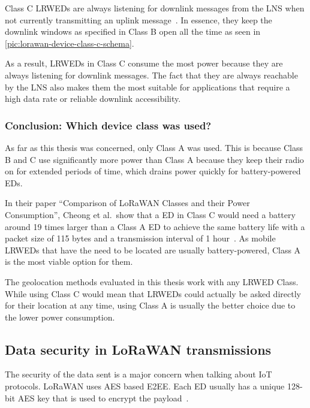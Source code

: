 Class C \aclp{LRWED} are always listening for downlink messages from the \ac{LNS} when not currently transmitting an uplink message~\cite[p. 86]{lora_alliance_inc_lorawan_specification_2017}.
In essence, they keep the downlink windows as specified in Class B open all the time as seen in \cref{pic:lorawan-device-class-c-schema}.

As a result, \aclp{LRWED} in Class C consume the most power because they are always listening for downlink messages.
The fact that they are always reachable by the \ac{LNS} also makes them the most suitable for applications that require a high data rate or reliable downlink accessibility.

\subsubsection{Conclusion: Which device class was used?}

As far as this thesis was concerned, only Class A was used.
This is because Class B and C use significantly more power than Class A because they keep their radio on for extended periods of time, which drains power quickly for battery-powered \aclp{ED}.

In their paper ``Comparison of LoRaWAN Classes and their Power Consumption'', Cheong et al.\ show that a \acl{ED} in Class C would need a battery around 19 times larger than a Class A \acl{ED} to achieve the same battery life with a packet size of 115 bytes and a transmission interval of 1 hour~\cite{cheong_comparison_2017}.
As mobile \aclp{LRWED} that have the need to be located are usually battery-powered, Class A is the most viable option for them.

The geolocation methods evaluated in this thesis work with any \acl{LRWED} Class.
While using Class C would mean that \aclp{LRWED} could actually be asked directly for their location at any time, using Class A is usually the better choice due to the lower power consumption.

\subsection{Data security in \acs{LoRaWAN} transmissions}

The security of the data sent is a major concern when talking about \ac{IoT} protocols.
\ac{LoRaWAN} uses \ac{AES} based \acf{E2EE}.
Each \acl{ED} usually has a unique 128-bit \ac{AES} key that is used to encrypt the payload~\cite[p. 24]{lora_alliance_inc_lorawan_specification_2017}.

